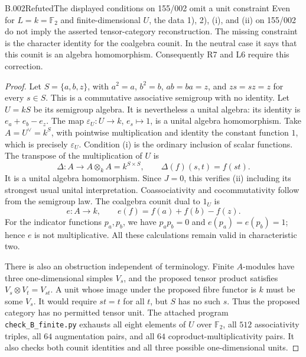 \begin{saresult}{B.002}{Refuted}{The displayed conditions on 155/002 omit a unit constraint}
Even for $L=k=\mathbb F_2$ and finite-dimensional $U$, the data 1), 2),
(i), and (ii) on 155/002 do not imply the asserted tensor-category
reconstruction. The missing constraint is the character identity for
the coalgebra counit. In the neutral case it says that this counit is
an algebra homomorphism. Consequently R7 and L6 require this correction.
\end{saresult}
\begin{proof}
Let $S=\{a,b,z\}$, with $a^2=a$, $b^2=b$, $ab=ba=z$, and $zs=sz=z$
for every $s\in S$. This is a commutative associative semigroup with no
identity. Let $U=kS$ be its semigroup algebra. It is nevertheless a
unital algebra: its identity is $e_a+e_b-e_z$. The map
$\varepsilon_U:U\longrightarrow k$, $e_s\longmapsto1$, is a unital
algebra homomorphism. Take $A=U^\vee=k^S$, with pointwise multiplication
and identity the constant function $1$, which is precisely
$\varepsilon_U$. Condition (i) is the ordinary inclusion of scalar
functions. The transpose of the multiplication of $U$ is
\[
 \Delta:A\longrightarrow A\otimes_k A=k^{S\times S},
 \qquad \Delta(f)(s,t)=f(st).
\]
It is a unital algebra homomorphism. Since $J=0$, this verifies (ii)
including its strongest usual unital interpretation. Coassociativity
and cocommutativity follow from the semigroup law. The coalgebra counit
dual to $1_U$ is
\[
 e:A\longrightarrow k,\qquad e(f)=f(a)+f(b)-f(z).
\]
For the indicator functions $p_a,p_b$, we have
$p_ap_b=0$ and $e(p_a)=e(p_b)=1$; hence $e$ is not multiplicative.
All these calculations remain valid in characteristic two.

There is also an obstruction independent of terminology. Finite
$A$-modules have three one-dimensional simples $V_s$, and the proposed
tensor product satisfies $V_s\otimes V_t=V_{st}$. A unit whose image
under the proposed fibre functor is $k$ must be some $V_s$. It would
require $st=t$ for all $t$, but $S$ has no such $s$. Thus the proposed
category has no permitted tensor unit. The attached program
\texttt{check\_B\_finite.py} exhausts all eight elements of $U$ over
$\mathbb F_2$, all $512$ associativity triples, all $64$ augmentation
pairs, and all $64$ coproduct-multiplicativity pairs. It also checks both
counit identities and all three possible one-dimensional units.
\end{proof}


